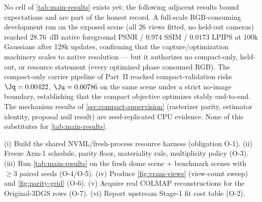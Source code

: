 No cell of \cref{tab:main-results} exists yet; the following adjacent results bound
expectations and are part of the honest record.
A full-scale RGB-consuming development run on the exposed scene (all 26 views fitted, no
held-out cameras) reached $28.76$~dB native foreground PSNR / $0.974$ SSIM / $0.0173$ LPIPS
at 100k Gaussians after 128k updates, confirming that the capture/optimization machinery
scales to native resolution --- but it authorizes no compact-only, held-out, or resource
statement (every optimized phase consumed RGB).
The compact-only carrier pipeline of Part~II reached compact-validation risks
$\Jq = 0.00422$, $\Ju = 0.00786$ on the same scene under a strict no-image
boundary, establishing that the compact objective
optimizes stably end-to-end.  The mechanism results of \cref{sec:compact-supervision}
(rasterizer parity, estimator identity, proposal null result) are seed-replicated CPU
evidence.  None of this substitutes for \cref{tab:main-results}.

\begin{ToShowBlock}
(i) Build the shared NVML/fresh-process resource harness (obligation O-1).
(ii) Freeze Arm-1 schedule, parity floor, materiality rule, multiplicity policy
(O-3).
(iii) Run \cref{tab:main-results} on the fresh dome scene + benchmark scenes with $\ge 3$
paired seeds (O-4/O-5).
(iv) Produce \cref{fig:vram-views} (view-count sweep) and \cref{fig:parity-grid} (O-6).
(v) Acquire real COLMAP reconstructions for the Original-3DGS rows (O-7).
(vi) Report upstream Stage-1 fit cost table (O-2).
\end{ToShowBlock}
